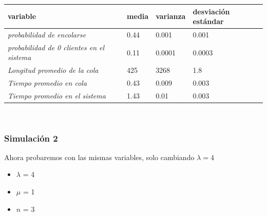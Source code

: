 \documentclass[11pt]{article}
\begin{document}
    \begin{table}[h]
\begin{tabular}{|l|l|l|l|}
\hline
\textbf{variable}                                 & \textbf{media} & \textbf{varianza} & \textbf{desviación estándar} \\ \hline
\textit{probabilidad de encolarse}                & 0.44           & 0.001             & 0.001                         \\ \hline
\textit{probabilidad de 0 clientes en el sistema} & 0.11           & 0.0001            & 0.0003                        \\ \hline
\textit{Longitud promedio de la cola}             & 425            & 3268              & 1.8                           \\ \hline
\textit{Tiempo promedio en cola}                  & 0.43           & 0.009             & 0.003                         \\ \hline
\textit{Tiempo promedio en el sistema}            & 1.43           & 0.01              & 0.003                         \\ \hline
\end{tabular}
\end{table} \\

    \subsubsection{Simulación 2}

    Ahora probaremos con las mismas variables, solo cambiando $\lambda = 4$ \\
    \begin{itemize}
        \item $\lambda$ = 4
        \item $\mu$ = 1
        \item $n$ = 3
    \end{itemize} \\
\end{document}
